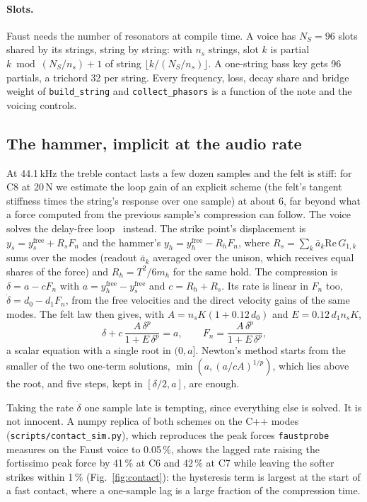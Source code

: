 \documentclass[10pt,a4paper,twocolumn]{article}
\newcommand{\probe}{\texttt{faustprobe}}
\newcommand{\code}[1]{\texttt{#1}}
\begin{document}
\paragraph{Slots.} Faust needs the number of resonators at compile time. A voice has $N_S = 96$ slots shared by its strings, string by string: with $n_s$ strings, slot $k$ is partial $k \bmod (N_S/n_s) + 1$ of string $\lfloor k / (N_S/n_s)\rfloor$. A one-string bass key gets 96 partials, a trichord 32 per string. Every frequency, loss, decay share and bridge weight of \code{build\_string} and \code{collect\_phasors} is a function of the note and the voicing controls.

\subsection{The hammer, implicit at the audio rate}

At 44.1\,kHz the treble contact lasts a few dozen samples and the felt is stiff: for C8 at 20\,N we estimate the loop gain of an explicit scheme (the felt's tangent stiffness times the string's response over one sample) at about 6, far beyond what a force computed from the previous sample's compression can follow. The voice solves the delay-free loop~\cite{borin2000} instead. The strike point's displacement is $y_s = y_s^{\mathrm{free}} + R_s F_n$ and the hammer's $y_h = y_h^{\mathrm{free}} - R_h F_n$, where $R_s = \sum_k \bar a_k \mathrm{Re}\,G_{1,k}$ sums over the modes (readout $\bar a_k$ averaged over the unison, which receives equal shares of the force) and $R_h = T^2/6m_h$ for the same hold. The compression is $\delta = a - cF_n$ with $a = y_h^{\mathrm{free}} - y_s^{\mathrm{free}}$ and $c = R_h + R_s$. Its rate is linear in $F_n$ too, $\dot\delta = d_0 - d_1F_n$, from the free velocities and the direct velocity gains of the same modes. The felt law then gives, with $A = n_sK(1+0.12\,d_0)$ and $E = 0.12\,d_1 n_s K$,
\begin{equation}
\delta + c\,\frac{A\,\delta^p}{1 + E\,\delta^p} = a, \qquad F_n = \frac{A\,\delta^p}{1+E\,\delta^p},
\end{equation}
a scalar equation with a single root in $(0, a]$. Newton's method starts from the smaller of the two one-term solutions, $\min(a, (a/cA)^{1/p})$, which lies above the root, and five steps, kept in $[\delta/2, a]$, are enough.

Taking the rate $\dot\delta$ one sample late is tempting, since everything else is solved. It is not innocent. A numpy replica of both schemes on the C++ modes (\code{scripts/contact\_sim.py}), which reproduces the peak forces \probe{} measures on the Faust voice to 0.05\,\%, shows the lagged rate raising the fortissimo peak force by 41\,\% at C6 and 42\,\% at C7 while leaving the softer strikes within 1\,\% (Fig.~\ref{fig:contact}): the hysteresis term is largest at the start of a fast contact, where a one-sample lag is a large fraction of the compression time.
\end{document}
